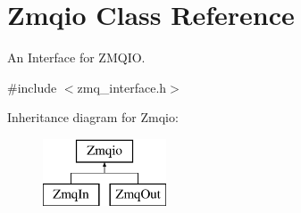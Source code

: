 \hypertarget{classZmqio}{\section{Zmqio Class Reference}
\label{classZmqio}
}


An Interface for Z\-M\-Q\-I\-O.  




{\ttfamily \#include $<$zmq\-\_\-interface.\-h$>$}

Inheritance diagram for Zmqio\-:\begin{figure}[H]
\begin{center}
\leavevmode
\includegraphics[height=2.000000cm]{classZmqio}
\end{center}
\end{figure}
